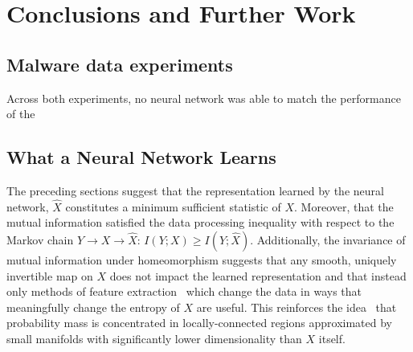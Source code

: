 \chapter{Conclusions and Further Work}
\label{chap:conclusion}

\section{Malware data experiments}
Across both experiments, no neural network was able to match the performance of the 


\section{What a Neural Network Learns}
The preceding sections suggest that the representation learned by the neural network, $\hat{X}$ constitutes a minimum sufficient statistic of $X$. 
Moreover, that the mutual information satisfied the data processing inequality with respect to the Markov chain $Y \to X \to \hat{X}$: $I(Y; X) \geq I(Y; \hat{X})$.
Additionally, the invariance of mutual information under homeomorphism suggests that any smooth, uniquely invertible map on $X$ does not impact the learned representation and that instead only methods of feature extraction~\cite{goodfellow2016deep} which change the data in ways that meaningfully change the entropy of $X$ are useful.
This reinforces the idea~\cite{goodfellow2014explaining} that probability mass is concentrated in locally-connected regions approximated by small manifolds with significantly lower dimensionality than $X$ itself.